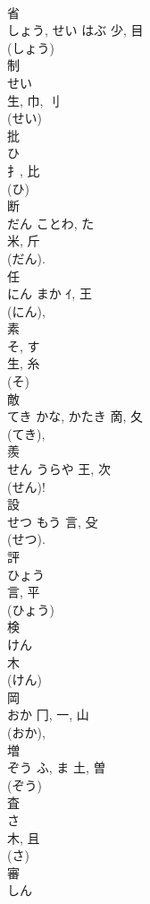 \documentclass[8pt]{extreport}
\begin{document}
\begin{CJK}{UTF8}{min}
\\	省	
\\	しょう, せい	はぶ	少, 目	
\\	(しょう) 
\\	制	
\\	せい	
\\	生, 巾, 刂	
\\	(せい) 
\\	批	
\\	ひ	
\\	扌, 比	
\\	(ひ) 
\\	断	
\\	だん	ことわ, た	
\\	米, 斤	
\\	(だん). 
\\	任	
\\	にん	まか	ｲ, 王	
\\	(にん), 
\\	素	
\\	そ, す	
\\	生, 糸	
\\	(そ) 
\\	敵	
\\	てき	かな, かたき	啇, 夂	
\\	(てき), 
\\	羨	
\\	せん	うらや	王, 次		
\\	(せん)! 
\\	設	
\\	せつ	もう	言, 殳	
\\	(せつ). 
\\	評	
\\	ひょう	
\\	言, 平	
\\	(ひょう) 
\\	検	
\\	けん	
\\	木		
\\	(けん) 
\\	岡	
\\	おか	冂, 一, 山		
\\	(おか), 
\\	増	
\\	ぞう	ふ, ま	土, 曽	
\\	(ぞう) 
\\	査	
\\	さ	
\\	木, 且	
\\	(さ) 
\\	審	
\\	しん	

\end{CJK}
\end{document}
